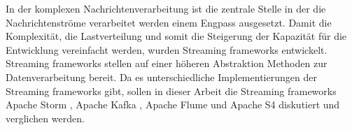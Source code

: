 In der komplexen Nachrichtenverarbeitung ist die zentrale Stelle in der die Nachrichtenströme verarbeitet werden einem Engpass ausgesetzt. Damit die Komplexität, die Lastverteilung und somit die Steigerung der Kapazität für die Entwicklung vereinfacht werden, wurden Streaming frameworks entwickelt. Streaming frameworks stellen auf einer höheren Abstraktion Methoden zur Datenverarbeitung bereit. Da es unterschiedliche Implementierungen der Streaming frameworks gibt, sollen in dieser Arbeit die Streaming frameworks Apache Storm , Apache Kafka , Apache Flume  und Apache S4  diskutiert und verglichen werden. 